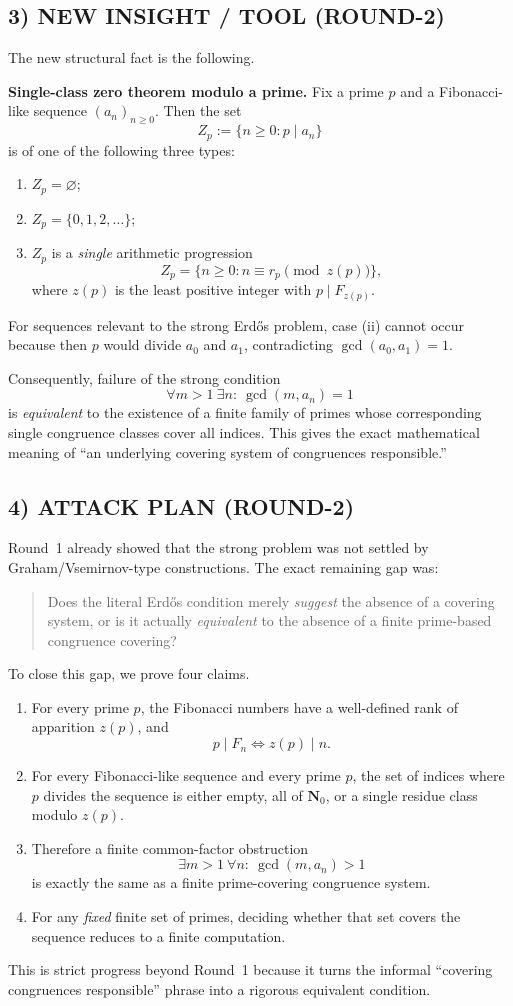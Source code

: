 \subsection*{3) NEW INSIGHT / TOOL (ROUND-2)}
The new structural fact is the following.

\medskip
\noindent\textbf{Single-class zero theorem modulo a prime.}
Fix a prime $p$ and a Fibonacci-like sequence $(a_n)_{n\ge 0}$. Then the set
\[
Z_p:=\{n\ge 0: p\mid a_n\}
\]
is of one of the following three types:
\begin{enumerate}
\item[(i)] $Z_p=\varnothing$;
\item[(ii)] $Z_p=\{0,1,2,\dots\}$;
\item[(iii)] $Z_p$ is a \emph{single} arithmetic progression
\[
Z_p=\{n\ge 0: n\equiv r_p\pmod{z(p)}\},
\]
where $z(p)$ is the least positive integer with $p\mid F_{z(p)}$.
\end{enumerate}
For sequences relevant to the strong Erd\H{o}s problem, case (ii) cannot occur because then $p$ would divide $a_0$ and $a_1$, contradicting $\gcd(a_0,a_1)=1$.

Consequently, failure of the strong condition
\[
\forall m>1\ \exists n:\ \gcd(m,a_n)=1
\]
is \emph{equivalent} to the existence of a finite family of primes whose corresponding single congruence classes cover all indices. This gives the exact mathematical meaning of ``an underlying covering system of congruences responsible.''

\subsection*{4) ATTACK PLAN (ROUND-2)}
Round~1 already showed that the strong problem was not settled by Graham/Vsemirnov-type constructions. The exact remaining gap was:
\begin{quote}
Does the literal Erd\H{o}s condition merely \emph{suggest} the absence of a covering system, or is it actually \emph{equivalent} to the absence of a finite prime-based congruence covering?
\end{quote}
To close this gap, we prove four claims.
\begin{enumerate}
\item[(A)] For every prime $p$, the Fibonacci numbers have a well-defined rank of apparition $z(p)$, and
\[
p\mid F_n \iff z(p)\mid n.
\]
\item[(B)] For every Fibonacci-like sequence and every prime $p$, the set of indices where $p$ divides the sequence is either empty, all of $\mathbf{N}_0$, or a single residue class modulo $z(p)$.
\item[(C)] Therefore a finite common-factor obstruction
\[
\exists m>1\ \forall n:\ \gcd(m,a_n)>1
\]
is exactly the same as a finite prime-covering congruence system.
\item[(D)] For any \emph{fixed} finite set of primes, deciding whether that set covers the sequence reduces to a finite computation.
\end{enumerate}
This is strict progress beyond Round~1 because it turns the informal ``covering congruences responsible'' phrase into a rigorous equivalent condition.

